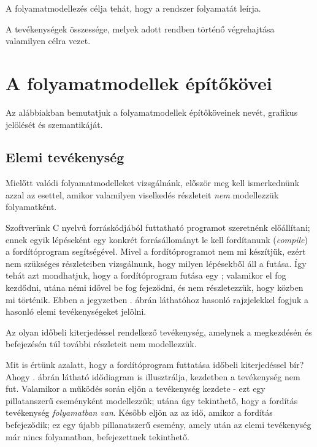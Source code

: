 A folyamatmodellezés célja tehát, hogy a rendszer folyamatát leírja.

\begin{definicio}
	A  tevékenységek összessége, melyek adott rendben történő végrehajtása valamilyen célra vezet.
\end{definicio}

\section{A folyamatmodellek építőkövei}

Az alábbiakban bemutatjuk a folyamatmodellek építőköveinek nevét, grafikus jelölését és szemantikáját.

\subsection{Elemi tevékenység}

Mielőtt valódi folyamatmodelleket vizsgálnánk, először meg kell ismerkednünk azzal az esettel, amikor valamilyen viselkedés részleteit \emph{nem} modellezzük folyamatként.

\begin{pelda}
Szoftverünk C nyelvű forráskódjából futtatható programot szeretnénk előállítani; ennek egyik lépéseként egy konkrét forrásállományt le kell fordítanunk (\emph{compile}) a fordítóprogram segítségével. Mivel a fordítóprogramot nem mi készítjük, ezért nem szükséges részleteiben vizsgálnunk, hogy milyen lépésekből áll a futása. Így tehát azt mondhatjuk, hogy a fordítóprogram futása egy ; valamikor el fog kezdődni, utána némi idővel be fog fejeződni, és nem részletezzük, hogy közben mi történik. Ebben a jegyzetben . ábrán láthatóhoz hasonló rajzjelekkel fogjuk a hasonló elemi tevékenységeket jelölni.
\end{pelda}

\begin{definicio}
	Az  olyan időbeli kiterjedéssel rendelkező tevékenység, amelynek a megkezdésén és befejezésén túl további részleteit nem modellezzük.
\end{definicio}


\begin{pelda}
Mit is értünk azalatt, hogy a fordítóprogram futtatása időbeli kiterjedéssel bír? Ahogy . ábrán látható idődiagram is illusztrálja, kezdetben a tevékenység nem fut. Valamikor a működés során eljön a tevékenység kezdete - ezt egy pillatanszerű eseményként modellezzük; utána úgy tekinthető, hogy a fordítás tevékenység \emph{folyamatban van}. Később eljön az az idő, amikor a fordítás befejeződik; ez egy újabb pillanatszerű esemény, amely után az elemi tevékenység már nincs folyamatban, befejezettnek tekinthető.
\end{pelda}


